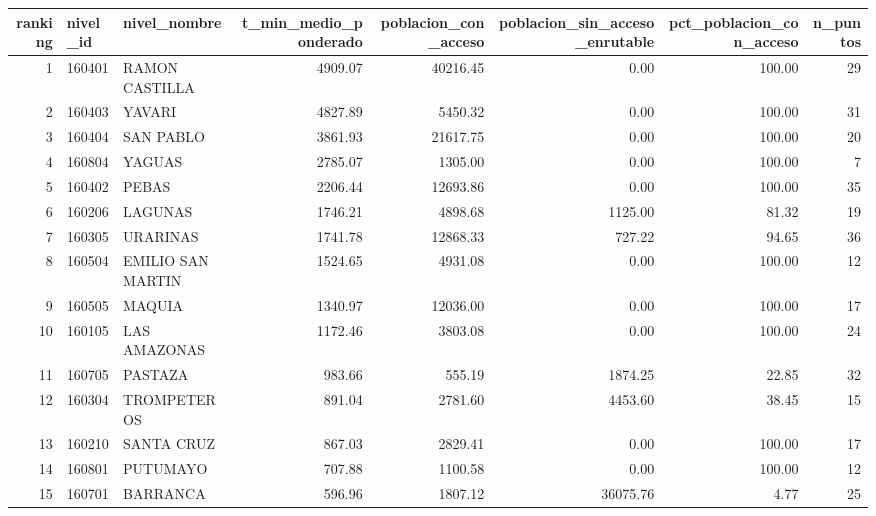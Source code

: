 \begin{tabular}{rllrrrrr}
\toprule
ranking & nivel_id & nivel_nombre & t_min_medio_ponderado & poblacion_con_acceso & poblacion_sin_acceso_enrutable & pct_poblacion_con_acceso & n_puntos \\
\midrule
1 & 160401 & RAMON CASTILLA & 4909.07 & 40216.45 & 0.00 & 100.00 & 29 \\
2 & 160403 & YAVARI & 4827.89 & 5450.32 & 0.00 & 100.00 & 31 \\
3 & 160404 & SAN PABLO & 3861.93 & 21617.75 & 0.00 & 100.00 & 20 \\
4 & 160804 & YAGUAS & 2785.07 & 1305.00 & 0.00 & 100.00 & 7 \\
5 & 160402 & PEBAS & 2206.44 & 12693.86 & 0.00 & 100.00 & 35 \\
6 & 160206 & LAGUNAS & 1746.21 & 4898.68 & 1125.00 & 81.32 & 19 \\
7 & 160305 & URARINAS & 1741.78 & 12868.33 & 727.22 & 94.65 & 36 \\
8 & 160504 & EMILIO SAN MARTIN & 1524.65 & 4931.08 & 0.00 & 100.00 & 12 \\
9 & 160505 & MAQUIA & 1340.97 & 12036.00 & 0.00 & 100.00 & 17 \\
10 & 160105 & LAS AMAZONAS & 1172.46 & 3803.08 & 0.00 & 100.00 & 24 \\
11 & 160705 & PASTAZA & 983.66 & 555.19 & 1874.25 & 22.85 & 32 \\
12 & 160304 & TROMPETEROS & 891.04 & 2781.60 & 4453.60 & 38.45 & 15 \\
13 & 160210 & SANTA CRUZ & 867.03 & 2829.41 & 0.00 & 100.00 & 17 \\
14 & 160801 & PUTUMAYO & 707.88 & 1100.58 & 0.00 & 100.00 & 12 \\
15 & 160701 & BARRANCA & 596.96 & 1807.12 & 36075.76 & 4.77 & 25 \\
\bottomrule
\end{tabular}
